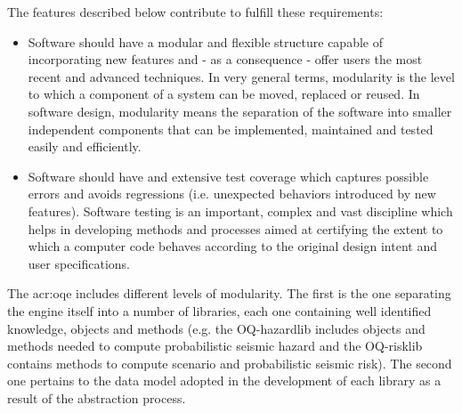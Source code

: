 The features described below contribute to fulfill these requirements: %
\begin{itemize}
\item Software should have a modular and flexible structure capable of incorporating new features and - as a consequence - offer users the most recent and advanced techniques.
%
In very general terms, modularity is the level to which a component of a system can be moved, replaced or reused.
%
In software design, modularity means the separation of the software
into smaller independent components that can be implemented, maintained and tested easily and efficiently.
%
\item Software should have and extensive test coverage which captures possible errors and avoids regressions (i.e. unexpected behaviors introduced by new features).
%
Software testing \citep{myers2012} is an important, complex and vast discipline which helps in developing methods and processes aimed at certifying the extent to which a computer code behaves according to the original design intent and user specifications.
\end{itemize}

The \gls{acr:oqe} includes different levels of modularity. The first is the one separating the engine itself into a number of libraries, each one containing well identified knowledge, objects and methods (e.g. the OQ-hazardlib includes objects and methods needed to compute probabilistic seismic hazard and the OQ-risklib contains methods to compute scenario and probabilistic seismic risk). The second one pertains to the data model adopted in the development of each library as a result of the abstraction process.